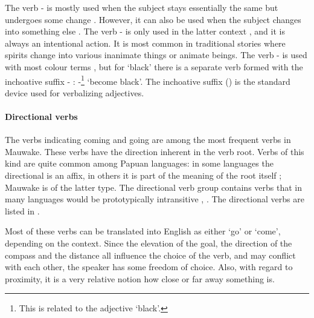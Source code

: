 The verb - is mostly used when the subject stays essentially the same but undergoes some change . However, it can also be used when the subject changes into something else . The verb - is only used in the latter context , and it is always an intentional action. It is most common in traditional stories where spirits change into various inanimate things or animate beings. The verb - is used with most colour terms , but for `black' there is a separate verb formed with the inchoative suffix \nobreakdash- : -\footnote{This is related to the adjective  `black'.} `become black'. The inchoative suffix () is the standard device used for verbalizing adjectives. 

\paragraph{Directional verbs}\label{sec:3.8.4.4.5}
{}
The verbs indicating coming and going are among the most frequent verbs in Mauwake. These verbs have the direction inherent in the verb root. Verbs of this kind are quite common among Papuan languages: in some languages the directional is an affix, in others it is part of the meaning of the root itself \citep[149]{Foley1986}; Mauwake is of the latter type. The directional verb group contains verbs that in many languages would be prototypically intransitive , . The directional verbs are listed in .

Most of these verbs can be translated into English as either `go' or `come', depending on the context. Since the elevation of the goal, the direction of the compass and the distance all influence the choice of the verb, and may conflict with each other, the speaker has some freedom of choice. Also, with regard to proximity, it is a very relative notion how close or far away something is.

